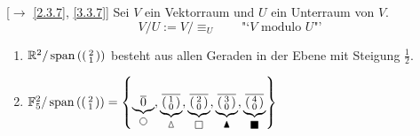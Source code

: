 \documentclass[../../main.tex]{subfiles}
\begin{document}
\begin{nt}\label{8.1.5}
[$\to$ \ref{2.3.7}, \ref{3.3.7}] Sei $V$ ein Vektorraum und $U$ ein Unterraum von $V$.
\[V/U:= V/{\equiv_U}\qquad\text{"`$V$ modulo $U$"'}\]
\end{nt}

\begin{bsp}\label{8.1.6}
\begin{enumerate}[\normalfont(a)]
\item $\mathbb R^2/\operatorname{span}\left(\left(\begin{smallmatrix}2\\1\end{smallmatrix}\right)\right)$ besteht aus allen Geraden in der Ebene mit Steigung $\frac{1}{2}$.

\begin{center}
\end{center}
\item $\F_5^2/\spann{\cvec{2\\1}} = \left\{\underbrace{\overline{0}}_{\tikz[scale = .5, baseline] \draw (0,0) circle (.2);},\underbrace{\overline{\cvec{1\\0}}}_{\tikz[scale = .5, baseline] \draw (-.14, -.14) -- (.14, -.14) -- (0, .2) -- cycle;},\underbrace{\overline{\cvec{2\\0}}}_{\tikz[scale = .5, baseline] \draw (-.2, -.2) rectangle (.2, .2);},\underbrace{\overline{\cvec{3\\0}}}_{\tikz[scale = .5, baseline] \filldraw (-.14, -.14) -- (.14, -.14) -- (0, .2) -- cycle;},\underbrace{\overline{\cvec{4\\0}}}_{\tikz[scale = .5, baseline] \filldraw (-.2, -.2) rectangle (.2, .2);}\right\}$
\begin{center}
\end{center}
\end{enumerate}
\end{bsp}
\end{document}
